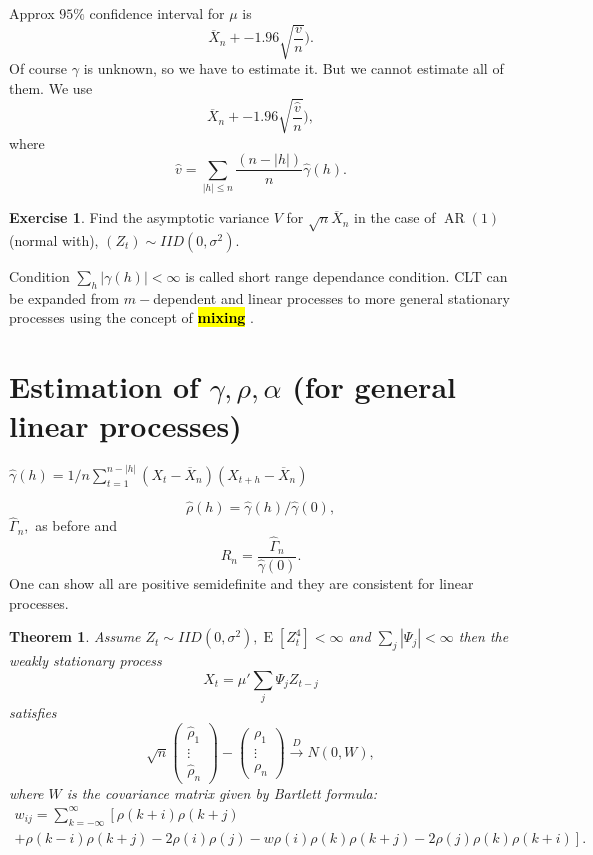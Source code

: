 \documentclass[12pt,a4paper, notitlepage]{book}
\newcommand{\hlc}[2][yellow]{ {\sethlcolor{#1} \hl{#2}} }
\newcommand{\hlcr}[1]{\hlc[lightred]{#1}}
\theoremstyle{definition} %
\newtheorem{exercise}[definition]{Exercise}
\theoremstyle{plain} %
\newtheorem{theorem}[definition]{Theorem}
\DeclareMathOperator{\E}{E}
\DeclareMathOperator{\Ar}{AR}
\newcommand{\New}[1]{ {\bf \hlcr{#1} } }
\begin{document}
Approx $95\%$ confidence interval for $\mu$ is 
\[ \overline{X}_n +- 1.96 \sqrt{\frac{v}{n}}). \]
 Of course $\gamma$ is unknown, so we have to estimate it. But we cannot estimate all of them.
 We use 
\[ \overline{X}_n +- 1.96 \sqrt{\frac{\hat{v}}{n}}) , \]
 where  
\[ \hat{v} = \sum_{|h| \leq n} \frac{(n - |h|)}{n}\hat{\gamma}(h). \]


\begin{exercise}
Find the asymptotic variance $V$ for $\sqrt{n} \overline{X}_n$ in the case of $\Ar(1)$ (normal with), $(Z_t) \sim IID(0, \sigma^2)$.
\end{exercise}

Condition $\sum_h |\gamma(h)| < \infty$ is called short range dependance condition. CLT can be expanded from 
$m-$dependent and linear processes to more general stationary processes using the concept of \New{ mixing}. 

\section{Estimation of $\gamma, \rho, \alpha$ (for general linear processes)}

$\hat{\gamma}(h) = 1/n \sum_{t = 1}^{n - |h|} (X_t - \overline{X}_n)(X_{t+h}-\overline{X}_n)$

\[ \hat{\rho}(h) = \hat{\gamma}(h) / \hat{\gamma}(0) , \] 
 $\hat{\Gamma}_n , $
 as before and 
\[ \hat{R}_n = \frac{\hat{\Gamma}_n}{\hat{\gamma}(0)}. \]
 One can show all are positive semidefinite and they are consistent for linear processes.

\begin{theorem}
Assume $Z_t \sim IID(0, \sigma^2), \E[Z_t^4] < \infty$ and $\sum_j |\Psi_j| < \infty$ then the weakly stationary process 
\[ X_t = \mu ' \sum_j \Psi_j Z_{t-j} \]
satisfies
\[ \sqrt{n} \left( \begin{array}{c} \hat{\rho}_1 \\ \vdots \\ \hat{\rho}_n \end{array} \right) - 
\left( \begin{array}{c} \rho _1 \\ \vdots \\ \rho_n \end{array} \right)  \overset{D}{\rightarrow} N(0,W), \]
 where $W$ is the covariance matrix given by Bartlett formula:
\begin{align*}
 w_{i j} = \sum_{k = -\infty}^{\infty} \left[\rho(k + i)\rho(k+j) \right. \\
\left. + \rho(k-i) \rho(k+j)-2\rho(i)\rho(j)-w\rho(i)\rho(k)\rho(k+j) - 2\rho(j)\rho(k)\rho(k+i) \right] . 
\end{align*}

\end{theorem}
\end{document}
